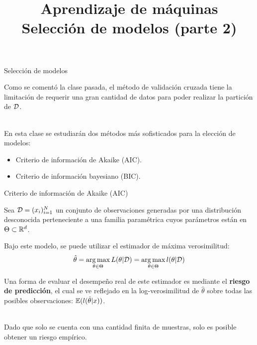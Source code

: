 \documentclass[9pt]{beamer}
\title{\textbf{Aprendizaje de máquinas} \\ Selección de modelos (parte 2)}
\begin{document}
\begin{frame}
  \titlepage
\end{frame}

\begin{frame}{Selección de modelos}

Como se comentó la clase pasada, el método de validación cruzada tiene la limitación de requerir una gran cantidad de datos para poder realizar la partición de ${\mathcal D}$.\\~\ \pause

En esta clase se estudiarán dos métodos más sofisticados para la elección de modelos:

\begin{itemize}
	\item Criterio de información de Akaike (AIC).
	\item Criterio de información bayesiano (BIC).
\end{itemize}
	
\end{frame}


\begin{frame}{Criterio de información de Akaike (AIC)}

Sea ${\mathcal D}=(x_i)_{i=1}^N$ un conjunto de observaciones generadas por una distribución desconocida perteneciente a una familia paramétrica cuyos parámetros están en $\Theta\subset\mathbb{R}^d$.\\ \pause

Bajo este modelo, se puede utilizar el estimador de máxima verosimilitud:
\begin{equation*}
	\hat{\theta} = \operatorname*{arg\,max}_{\theta\in\Theta} L(\theta|{\mathcal D}) =  \operatorname*{arg\,max}_{\theta\in\Theta} l(\theta|{\mathcal D})
\end{equation*}

Una forma de evaluar el desempeño real de este estimador es mediante el \textbf{riesgo de predicción}, el cual se ve reflejado en la log-verosimilitud de $\hat{\theta}$ sobre todas las posibles observaciones: $\operatorname{\mathbb{E}}(l(\hat{\theta}|x))$.\\~\ \pause

Dado que solo se cuenta con una cantidad finita de muestras, solo es posible obtener un riesgo empírico.\\

\end{frame}
\end{document}
